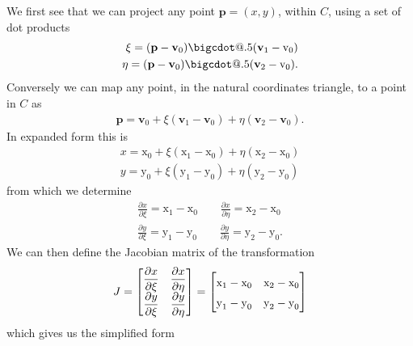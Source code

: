 \documentclass[11pt,letterpaper,titlepage]{article}
\makeatletter
\newcommand*\bigcdot{\mathpalette\bigcdot@{.5}}
\newcommand*\bigcdot@[2]{\mathbin{\vcenter{\hbox{\scalebox{#2}{$\m@th#1\bullet$}}}}}
\numberwithin{equation}{section}
\makeatother
\begin{document}
We first see that we can project any point $\textbf{p}{=}(x,y)$, within $C$, using a set of dot products
\begin{align}
\xi = (\textbf{p}-\textbf{v}_0) {\bigcdot} (\textbf{v}_1-\text{v}_0) \\
\eta = (\textbf{p}-\textbf{v}_0) {\bigcdot} (\textbf{v}_2-\text{v}_0).
\end{align}
Conversely we can map any point, in the natural coordinates triangle, to a point in $C$ as
\begin{align}
\textbf{p} = \textbf{v}_0 + \xi (\textbf{v}_1-\textbf{v}_0) + \eta  (\textbf{v}_2-\textbf{v}_0).
\end{align}
In expanded form this is
\begin{align*}
x = \text{x}_0 + \xi (\text{x}_1-\text{x}_0) + \eta  (\text{x}_2-\text{x}_0) \\
y = \text{y}_0 + \xi (\text{y}_1-\text{y}_0) + \eta  (\text{y}_2-\text{y}_0) 
\end{align*}
from which we determine 
\begin{align*}
\frac{\partial x}{\partial \xi} = \text{x}_1-\text{x}_0 
\quad \quad
\frac{\partial x}{\partial \eta} = \text{x}_2-\text{x}_0 \\
\frac{\partial y}{\partial \xi} = \text{y}_1-\text{y}_0 
\quad \quad
\frac{\partial y}{\partial \eta} = \text{y}_2-\text{y}_0. 
\end{align*}
We can then define the Jacobian matrix of the transformation
\begin{align}
J = 
\begin{bmatrix}
\dfrac{\partial x}{\partial \xi} & \dfrac{\partial x}{\partial \eta} \\
\dfrac{\partial y}{\partial \xi} & \dfrac{\partial y}{\partial \eta}
\end{bmatrix}
=
\renewcommand*{\arraystretch}{1.5}
\begin{bmatrix}
\text{x}_1-\text{x}_0 & \text{x}_2-\text{x}_0 \\
\text{y}_1-\text{y}_0 & \text{y}_2-\text{y}_0
\end{bmatrix}
\end{align}
which gives us the simplified form 
\end{document}
